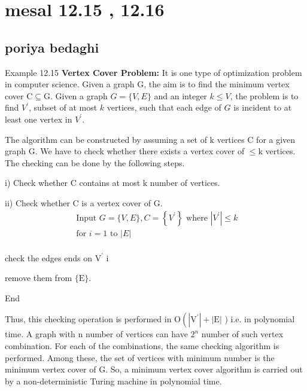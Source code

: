 \documentclass [12pt]{beamer}
\begin{document}
\section*{mesal 12.15 , 12.16 }
\subsection*{poriya bedaghi  }	
\begin{frame}
\justifying
Example 12.15 \textbf{ Vertex Cover Problem:} It is one type of optimization problem in computer science. Given a graph $\mathrm{G}$, the aim is to find the minimum vertex cover $\mathrm{C} \subseteq \mathrm{G}$. Given a graph $G=\{V, E\}$ and an integer $k \leq V$, the problem is to find $V^{\prime}$, subset of at most $k$ vertices, such that each edge of $G$ is incident to at least one vertex in $V^{\prime}$.

The algorithm can be constructed by assuming a set of $\mathrm{k}$ vertices $\mathrm{C}$ for a given graph $\mathrm{G}$. We have to check whether there exists a vertex cover of $\leq \mathrm{k}$ vertices. The checking can be done by the following steps.


i) Check whether $\mathrm{C}$ contains at most $\mathrm{k}$ number of vertices.


ii) Check whether $\mathrm{C}$ is a vertex cover of $\mathrm{G}$.
$$
\begin{array}{l}
	\text { Input } G=\{V, E\}, C=\left\{V^{\prime}\right\} \text { where }\left|V^{\prime}\right| \leq k \\
	\text { for } i=1 \text { to }|E|\\
\end{array}
$$
\begin{center}
	
check the edges ends on $\mathrm{V}^{\prime}$ i 


remove them from $\{\mathrm{E}\}$. 


End

\end{center}
\end{frame}

\begin{frame}

Thus, this checking operation is performed in $\mathrm{O}\left(\left|\mathrm{V}^{\prime}\right|+|\mathrm{E}|\right.$ ) i.e. in polynomial time. A graph with n number of vertices can have $2^{n}$ number of such vertex combination. For each of the combinations, the same checking algorithm is performed. Among these, the set of vertices with minimum number is the minimum vertex cover of G. So, a minimum vertex cover algorithm is carried out by a non-deterministic Turing machine in polynomial time.

\end{frame}
\end{document}
